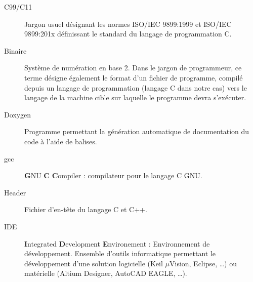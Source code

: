\begin{description}
\item[C99/C11] Jargon usuel désignant les normes ISO/IEC 9899:1999 et ISO/IEC 9899:201x définissant le standard du langage de programmation C.
\item[Binaire] Système de numération en base 2.\linebreak
Dans le jargon de programmeur, ce terme désigne également le format d’un fichier de programme, compilé depuis un langage de programmation (langage C dans notre cas) vers le langage de la machine cible sur laquelle le programme devra s’exécuter.
\item[Doxygen] Programme permettant la génération automatique de documentation du code à l’aide de balises.
\item[gcc] \textbf{G}NU \textbf{C} \textbf{C}ompiler : compilateur pour le langage C GNU.
\item[Header] Fichier d’en-tête du langage C et C++.
\item[IDE] \textbf{I}ntegrated \textbf{D}evelopment \textbf{E}nvironement : Environnement de développement.\linebreak
Ensemble d’outils informatique permettant le développement d’une solution logicielle (Keil $\mu$Vision, Eclipse, …) ou matérielle (Altium Designer, AutoCAD EAGLE, …).
\end{description}
\pagebreak